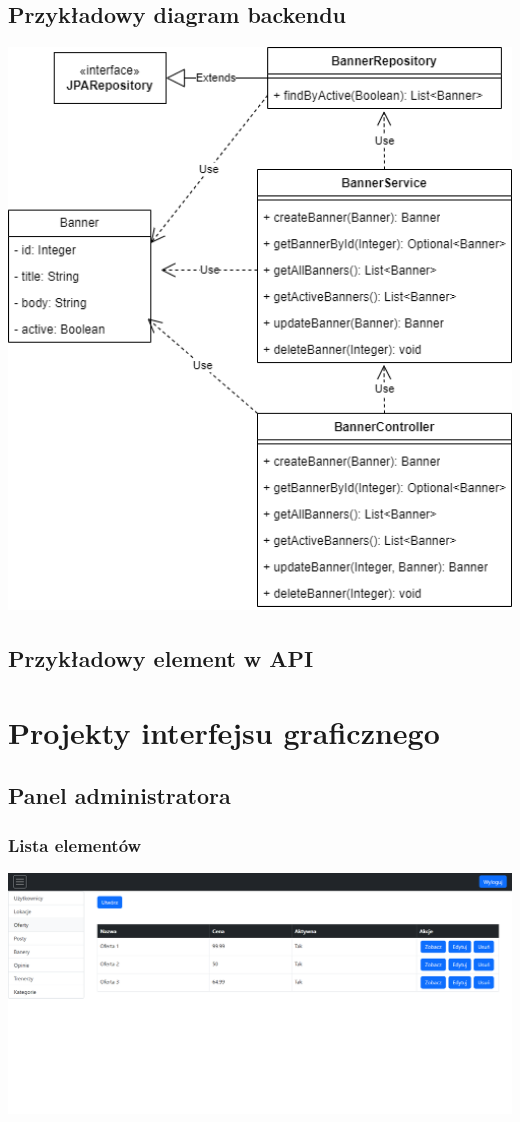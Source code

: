 \documentclass[12pt]{article}
\begin{document}
\subsection{Przykładowy diagram backendu}
\includegraphics[width=1\textwidth, angle=0]{images/Class_diagram_Java.png}
\subsection{Przykładowy element w API}
\section{Projekty interfejsu graficznego}
\subsection{Panel administratora}
\subsubsection{Lista elementów}
\includegraphics[width=1\textwidth, angle=0]{images/Interface_list.png}
\end{document}

